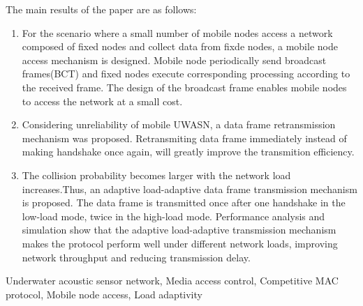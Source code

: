 \noindent The main results of the paper are as follows:
\vspace{-12pt}
\begin{enumerate} \setlength{\itemsep}{0pt}
	\item For the scenario where a small number of mobile nodes access a network composed of fixed nodes and collect data from fixde nodes, a mobile node access mechanism is designed. Mobile node periodically send broadcast frames(BCT) and fixed nodes execute corresponding processing according to the received frame. The design of the broadcast frame enables mobile nodes to access the network at a small cost.
	\item Considering unreliability of mobile UWASN, a data frame retransmission mechanism was proposed. Retransmiting data frame immediately instead of making handshake once again, will greatly improve the transmition efficiency. 
	\item The collision probability becomes larger with the network load increases.Thus, an adaptive load-adaptive data frame transmission mechanism is proposed. The data frame is transmitted once after one handshake in the low-load mode, twice in the high-load mode. Performance analysis and simulation show that the adaptive load-adaptive transmission mechanism makes the protocol perform well under different network loads, improving network throughput and reducing transmission delay.

\end{enumerate}
\vspace{-12pt}

\vspace{1em}
 \quad Underwater acoustic sensor network, Media access control, Competitive MAC protocol, Mobile node access, Load adaptivity

\clearpage
\endinput